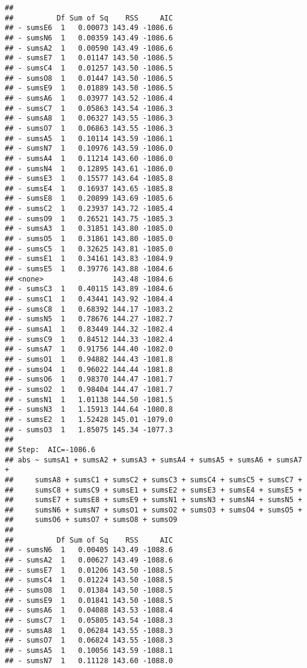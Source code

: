 \documentclass[,man,floatsintext]{apa6}
\begin{document}
\begin{verbatim}
## 
##          Df Sum of Sq    RSS     AIC
## - sumsE6  1   0.00073 143.49 -1086.6
## - sumsN6  1   0.00359 143.49 -1086.6
## - sumsA2  1   0.00590 143.49 -1086.6
## - sumsE7  1   0.01147 143.50 -1086.5
## - sumsC4  1   0.01257 143.50 -1086.5
## - sumsO8  1   0.01447 143.50 -1086.5
## - sumsE9  1   0.01889 143.50 -1086.5
## - sumsA6  1   0.03977 143.52 -1086.4
## - sumsC7  1   0.05863 143.54 -1086.3
## - sumsA8  1   0.06327 143.55 -1086.3
## - sumsO7  1   0.06863 143.55 -1086.3
## - sumsA5  1   0.10114 143.59 -1086.1
## - sumsN7  1   0.10976 143.59 -1086.0
## - sumsA4  1   0.11214 143.60 -1086.0
## - sumsN4  1   0.12895 143.61 -1086.0
## - sumsE3  1   0.15577 143.64 -1085.8
## - sumsE4  1   0.16937 143.65 -1085.8
## - sumsE8  1   0.20899 143.69 -1085.6
## - sumsC2  1   0.23937 143.72 -1085.4
## - sumsO9  1   0.26521 143.75 -1085.3
## - sumsA3  1   0.31851 143.80 -1085.0
## - sumsO5  1   0.31861 143.80 -1085.0
## - sumsC5  1   0.32625 143.81 -1085.0
## - sumsE1  1   0.34161 143.83 -1084.9
## - sumsE5  1   0.39776 143.88 -1084.6
## <none>                143.48 -1084.6
## - sumsC3  1   0.40115 143.89 -1084.6
## - sumsC1  1   0.43441 143.92 -1084.4
## - sumsC8  1   0.68392 144.17 -1083.2
## - sumsN5  1   0.78676 144.27 -1082.7
## - sumsA1  1   0.83449 144.32 -1082.4
## - sumsC9  1   0.84512 144.33 -1082.4
## - sumsA7  1   0.91756 144.40 -1082.0
## - sumsO1  1   0.94882 144.43 -1081.8
## - sumsO4  1   0.96022 144.44 -1081.8
## - sumsO6  1   0.98370 144.47 -1081.7
## - sumsO2  1   0.98404 144.47 -1081.7
## - sumsN1  1   1.01138 144.50 -1081.5
## - sumsN3  1   1.15913 144.64 -1080.8
## - sumsE2  1   1.52428 145.01 -1079.0
## - sumsO3  1   1.85075 145.34 -1077.3
## 
## Step:  AIC=-1086.6
## abs ~ sumsA1 + sumsA2 + sumsA3 + sumsA4 + sumsA5 + sumsA6 + sumsA7 + 
##     sumsA8 + sumsC1 + sumsC2 + sumsC3 + sumsC4 + sumsC5 + sumsC7 + 
##     sumsC8 + sumsC9 + sumsE1 + sumsE2 + sumsE3 + sumsE4 + sumsE5 + 
##     sumsE7 + sumsE8 + sumsE9 + sumsN1 + sumsN3 + sumsN4 + sumsN5 + 
##     sumsN6 + sumsN7 + sumsO1 + sumsO2 + sumsO3 + sumsO4 + sumsO5 + 
##     sumsO6 + sumsO7 + sumsO8 + sumsO9
## 
##          Df Sum of Sq    RSS     AIC
## - sumsN6  1   0.00405 143.49 -1088.6
## - sumsA2  1   0.00627 143.49 -1088.6
## - sumsE7  1   0.01206 143.50 -1088.5
## - sumsC4  1   0.01224 143.50 -1088.5
## - sumsO8  1   0.01384 143.50 -1088.5
## - sumsE9  1   0.01841 143.50 -1088.5
## - sumsA6  1   0.04088 143.53 -1088.4
## - sumsC7  1   0.05805 143.54 -1088.3
## - sumsA8  1   0.06284 143.55 -1088.3
## - sumsO7  1   0.06824 143.55 -1088.3
## - sumsA5  1   0.10056 143.59 -1088.1
## - sumsN7  1   0.11128 143.60 -1088.0

\end{verbatim}
\end{document}
